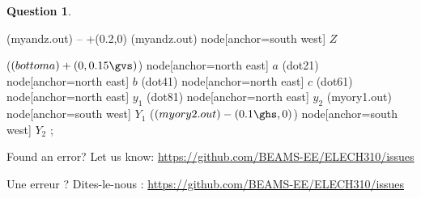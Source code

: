 \documentclass[11pt,a4paper,dvipsnames]{article}
\theoremstyle{definition}%
\newtheorem{Q}{Question}[] %
\newcommand{\fr}[1]{
 	\ifthenelse {\boolean{fr}} {#1} {}
 }
\newcommand{\en}[1]{
 	\ifthenelse {\boolean{en}} {#1} {}
 }
\newlength{\gvs}%
\newlength{\ghs}%
\begin{document}
\begin{Q}
{\begin{circuitikz}[scale=0.8, every node/.style={scale=0.8}]
				(myandz.out) -- +(0.2\ghs,0)
				(myandz.out) node[anchor=south west] {\Large $Z$}
		
				($(bottoma)+(0,0.15\gvs)$) node[anchor=north east] {\Large $a$}
				(dot21) node[anchor=north east] {\Large $b$}
				(dot41) node[anchor=north east] {\Large $c$}
				(dot61) node[anchor=north east] {\Large $y_1$}
				(dot81) node[anchor=north east] {\Large $y_2$}
				(myory1.out) node[anchor=south west] {\Large $Y_1$}
				($(myory2.out)-(0.1\ghs,0)$) node[anchor=south west] {\Large $Y_2$}
				;
			\end{circuitikz}
	}

\end{Q}	


\vfill
\footnotesize{
\en{Found an error? Let us know: \url{https://github.com/BEAMS-EE/ELECH310/issues}}
\fr{Une erreur ? Dites-le-nous : \url{https://github.com/BEAMS-EE/ELECH310/issues}}
}
\end{document}
